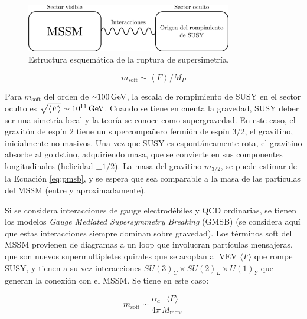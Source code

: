 
\begin{figure}
  \centering
  \includegraphics[width=0.8\textwidth]{images/theory/hidden_sec.pdf}
  \caption{Estructura esquemática de la ruptura de supersimetría.}
  \label{fig:hidden_sector}
\end{figure}

\begin{equation}
m_{\text{soft}} \sim \left< F \right>/M_P
\label{eq:pmsb}
\end{equation}

Para $m_{\text{soft}}$ del orden de ${\smallsim}100\,\gev$, la escala de rompimiento de SUSY en el sector oculto es $\sqrt{\langle F \rangle}\sim 10^{11}\,\text{GeV}$.
Cuando se tiene en cuenta la gravedad, SUSY deber ser una simetría local y la
teoría se conoce como supergravedad. En este caso, el gravitón de espín $2$ tiene un
supercompañero fermión de espín $3/2$, el gravitino, inicialmente no masivos. Una vez
que SUSY es espontáneamente rota, el gravitino absorbe al goldstino, adquiriendo
masa, que se convierte en sus componentes longitudinales (helicidad $\pm1/2$). La masa
del gravitino $m_{3/2}$, se puede estimar de la Ecuación \ref{eq:pmsb}, y se espera que sea comparable a la masa de las partículas del MSSM (entre  y  aproximadamente).

Si se considera interacciones de gauge electrodébiles y QCD ordinarias, se tienen
los modelos \textit{Gauge Mediated Supersymmetry Breaking} (GMSB) \cite{Dine:1981gu, ALVAREZGAUME198296, Nappi:1982hm} (se considera aquí que estas interacciones siempre dominan sobre gravedad). Los términos
soft del MSSM provienen de diagramas a un loop que involucran partículas mensajeras, que son nuevos supermultipletes quirales que se acoplan al VEV $\langle F \rangle$ que
rompe SUSY, y tienen a su vez interacciones $SU(3)_C \times SU(2)_L \times U(1)_Y$ que generan
la conexión con el MSSM. Se tiene en este caso:

\begin{equation}
m_{\text{soft}} \sim \frac{\alpha_a}{4\pi}\frac{\langle F \rangle}{M_\text{mens}}
\label{eq:gmsb}
\end{equation}

